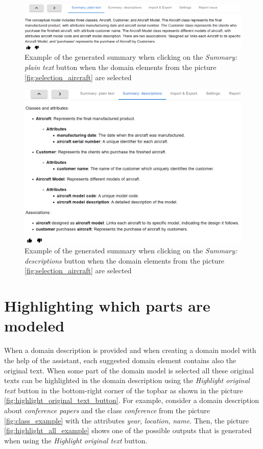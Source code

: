 \begin{figure}[!h]
    \includegraphics[scale=0.37]{../docs/images/frontend/summary-plain-text.png}
    \caption{\centering Example of the generated summary when clicking on the \textit{Summary: plain text} button when the domain elements from the picture \ref{fig:selection_aircraft} are selected}
    \label{fig:summary_plain_text}
\end{figure}

\begin{figure}[!h]
    \includegraphics[scale=0.41]{../docs/images/frontend/summary-descriptions.png}
    \caption{\centering Example of the generated summary when clicking on the \textit{Summary: descriptions} button when the domain elements from the picture \ref{fig:selection_aircraft} are selected}
    \label{fig:summary_description}
\end{figure}

\clearpage

\section{Highlighting which parts are modeled}

When a domain description is provided and when creating a domain model with the help of the assistant, each suggested domain element contains also the original text. When some part of the domain model is selected all these original texts can be highlighted in the domain description using the \textit{Highlight original text} button in the bottom-right corner of the topbar as shown in the picture \ref{fig:highlight_original_text_button}. For example, consider a domain description about \textit{conference papers} and the class \textit{conference} from the picture \ref{fig:class_example} with the attributes \textit{year}, \textit{location}, \textit{name}. Then, the picture \ref{fig:highlight_all_example} shows one of the possible outputs that is generated when using the \textit{Highlight original text} button.


